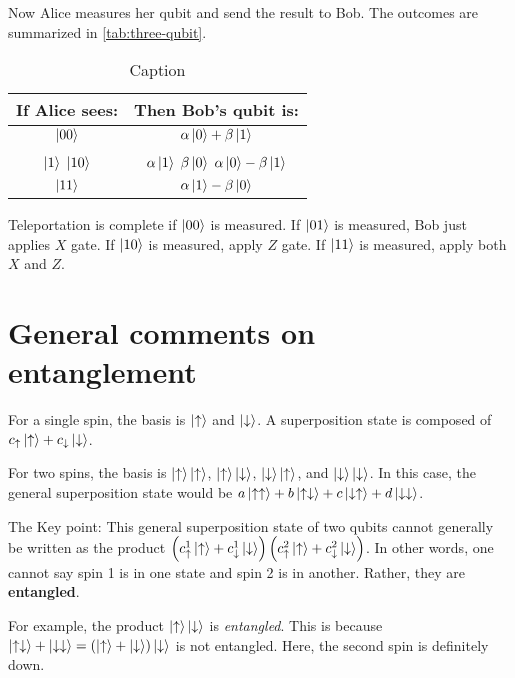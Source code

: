 \documentclass[12pt, english]{book}
\begin{document}
Now Alice measures her qubit and send the result to Bob.
The outcomes are summarized in \autoref{tab:three-qubit}.

\begin{table}[!ht]
	\centering
	\begin{tabular}{cc}
		If Alice sees: & Then Bob's qubit is: \\
		\toprule 
		$\ket{00}$ & $\alpha \ket{0} + \beta \ket{1}$ \\
		$\ket{1}$ $\ket{10}$ & $\alpha \ket{1}$ $\beta \ket{0}$ $\alpha \ket{0} - \beta \ket{1}$ \\
		$\ket{11}$ & $\alpha \ket{1} - \beta \ket{0}$
	\end{tabular}
	\caption{Caption}
	\label{tab:three-qubit}
\end{table}

Teleportation is complete if $\ket{00}$ is measured.
If $\ket{01}$ is measured, Bob just applies $X$ gate.
If $\ket{10}$ is measured, apply $Z$ gate.
If $\ket{11}$ is measured, apply both $X$ and $Z$.

\section[General comments]{General comments on entanglement}

For a single spin, the basis is $\ket{\uparrow}$ and $\ket{\downarrow}$.
A superposition state is composed of $c_{\uparrow} \ket{\uparrow} + c_{\downarrow} \ket{\downarrow}$.

For two spins, the basis is $\ket{\uparrow} \ket{\uparrow}$, $\ket{\uparrow} \ket{\downarrow}$, $\ket{\downarrow} \ket{\uparrow}$, and $\ket{\downarrow} \ket{\downarrow}$.
In this case, the general superposition state would be $a \ket{\uparrow \uparrow} + b \ket{\uparrow \downarrow} + c \ket{\downarrow \uparrow} + d \ket{\downarrow \downarrow}$.

The Key point: This general superposition state of two qubits cannot generally be written as the product $\left( c_{\uparrow}^1 \ket{\uparrow} + c_{\downarrow}^1 \ket{\downarrow} \right) \left( c_{\uparrow}^2 \ket{\uparrow} + c_{\downarrow}^2 \ket{\downarrow} \right)$.
In other words, one cannot say spin 1 is in one state and spin 2 is in another.
Rather, they are \textbf{entangled}.

For example, the product $\ket{\uparrow} \ket{\downarrow}$ is \emph{entangled}.
This is because $\ket{\uparrow \downarrow} + \ket{\downarrow \downarrow} = \left( \ket{\uparrow} + \ket{\downarrow} \right) \ket{\downarrow}$ is not entangled.
Here, the second spin is definitely down.
\end{document}
